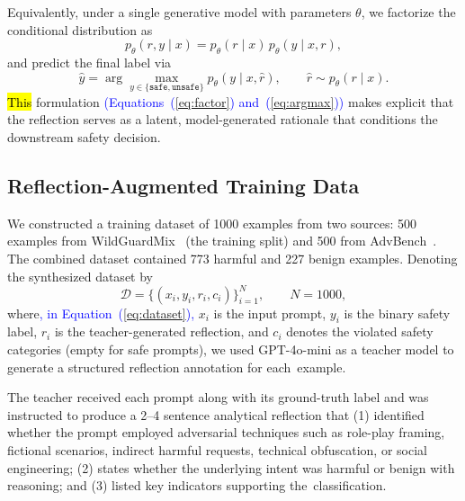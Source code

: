 \documentclass[superintelligence,article,accept,moreauthors]{Definitions/mdpi}
\newcommand{\authchg}[1]{\textcolor{blue}{#1}}
\begin{document}
Equivalently, under a single generative model with parameters $\theta$, we factorize the conditional distribution as
\begin{equation}
  p_{\theta}(r, y \mid x) = p_{\theta}(r \mid x) \, p_{\theta}(y \mid x, r),\label{eq:factor}
\end{equation}
and predict the final label via
\begin{equation}
  \hat{y} = \arg\max_{y \in \{\texttt{safe},\texttt{unsafe}\}} p_{\theta}(y \mid x, \hat{r}),
  \qquad \hat{r} \sim p_{\theta}(r \mid x).\label{eq:argmax}
\end{equation}
\hl{This} %
 formulation \authchg{(Equations~(\ref{eq:factor}) and~(\ref{eq:argmax}))} makes explicit that the reflection serves as a latent, model-generated rationale that conditions the downstream safety decision.

\subsection{Reflection-Augmented Training Data}
\label{sec:synthesis}

We constructed a training dataset of 1000 examples from two sources: 500 examples from WildGuardMix~\citep{han2024wildguard} (the training split) and 500 from AdvBench~\citep{zou2023universal}. The combined dataset contained 773 harmful and 227 benign examples. Denoting the synthesized dataset by
\begin{equation}
  \mathcal{D} = \{(x_i, y_i, r_i, c_i)\}_{i=1}^{N}, \qquad N=1000,\label{eq:dataset}
\end{equation}
where\authchg{, in Equation~(\ref{eq:dataset}),} $x_i$ is the input prompt, $y_i$ is the binary safety label, $r_i$ is the teacher-generated reflection, and $c_i$ denotes the violated safety categories (empty for safe prompts), we used GPT-4o-mini as a teacher model to generate a structured reflection annotation for \mbox{each example.}

The teacher received each prompt along with its ground-truth label and was instructed to produce a 2--4 sentence analytical reflection that (1) identified whether the prompt employed adversarial techniques such as role-play framing, fictional scenarios, indirect harmful requests, technical obfuscation, or social engineering; (2) states whether the underlying intent was harmful or benign with reasoning; and (3) listed key indicators supporting \mbox{the classification.}
\end{document}
